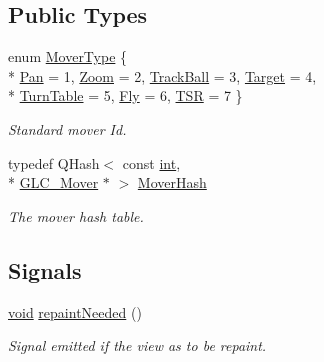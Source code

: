 \subsection*{Public Types}
\begin{DoxyCompactItemize}
\item 
enum \hyperlink{class_g_l_c___mover_controller_a574d11af2d0143e7e72f584fabab381f}{Mover\-Type} \{ \\*
\hyperlink{class_g_l_c___mover_controller_a574d11af2d0143e7e72f584fabab381fa4b4316aabc6d52b29900deffddda5756}{Pan} = 1, 
\hyperlink{class_g_l_c___mover_controller_a574d11af2d0143e7e72f584fabab381fa7adae7a29d88fa042e72219fd210992d}{Zoom} = 2, 
\hyperlink{class_g_l_c___mover_controller_a574d11af2d0143e7e72f584fabab381fa0a6ba5a5c315d3359b2c419ae8c76d0d}{Track\-Ball} = 3, 
\hyperlink{class_g_l_c___mover_controller_a574d11af2d0143e7e72f584fabab381fa749ead8121ec8a39a0b3a00a55d2203b}{Target} = 4, 
\\*
\hyperlink{class_g_l_c___mover_controller_a574d11af2d0143e7e72f584fabab381fab949c13084daf119ffefd042d3307090}{Turn\-Table} = 5, 
\hyperlink{class_g_l_c___mover_controller_a574d11af2d0143e7e72f584fabab381fafb068ac4e9151a68d9f210a979faaece}{Fly} = 6, 
\hyperlink{class_g_l_c___mover_controller_a574d11af2d0143e7e72f584fabab381fa2e9233cf45fb6c6eca04a607b338e270}{T\-S\-R} = 7
 \}
\begin{DoxyCompactList}\small\item\em Standard mover Id. \end{DoxyCompactList}\item 
typedef Q\-Hash$<$ const \hyperlink{ioapi_8h_a787fa3cf048117ba7123753c1e74fcd6}{int}, \\*
\hyperlink{class_g_l_c___mover}{G\-L\-C\-\_\-\-Mover} $\ast$ $>$ \hyperlink{class_g_l_c___mover_controller_ab7dea356f0b6ba626dac8278012f8f40}{Mover\-Hash}
\begin{DoxyCompactList}\small\item\em The mover hash table. \end{DoxyCompactList}\end{DoxyCompactItemize}
\subsection*{Signals}
\begin{DoxyCompactItemize}
\item 
\hyperlink{group___u_a_v_objects_plugin_ga444cf2ff3f0ecbe028adce838d373f5c}{void} \hyperlink{class_g_l_c___mover_controller_aedc8ecdf90553b90d512b0543f91bf91}{repaint\-Needed} ()
\begin{DoxyCompactList}\small\item\em Signal emitted if the view as to be repaint. \end{DoxyCompactList}\end{DoxyCompactItemize}
